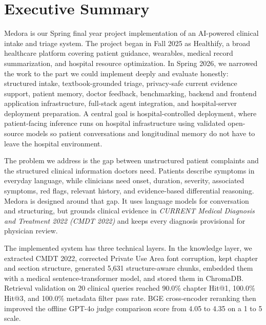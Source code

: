 
\chapter*{Executive Summary}

Medora is our Spring final year project implementation of an AI-powered clinical intake and triage system. The project began in Fall 2025 as Healthify, a broad healthcare platform covering patient guidance, wearables, medical record summarization, and hospital resource optimization. In Spring 2026, we narrowed the work to the part we could implement deeply and evaluate honestly: structured intake, textbook-grounded triage, privacy-safe current evidence support, patient memory, doctor feedback, benchmarking, backend and frontend application infrastructure, full-stack agent integration, and hospital-server deployment preparation. A central goal is hospital-controlled deployment, where patient-facing inference runs on hospital infrastructure using validated open-source models so patient conversations and longitudinal memory do not have to leave the hospital environment.

The problem we address is the gap between unstructured patient complaints and the structured clinical information doctors need. Patients describe symptoms in everyday language, while clinicians need onset, duration, severity, associated symptoms, red flags, relevant history, and evidence-based differential reasoning. Medora is designed around that gap. It uses language models for conversation and structuring, but grounds clinical evidence in \textit{CURRENT Medical Diagnosis and Treatment 2022 (CMDT 2022)} and keeps every diagnosis provisional for physician review.

The implemented system has three technical layers. In the knowledge layer, we extracted CMDT 2022, corrected Private Use Area font corruption, kept chapter and section structure, generated 5,631 structure-aware chunks, embedded them with a medical sentence-transformer model, and stored them in ChromaDB. Retrieval validation on 20 clinical queries reached 90.0\% chapter Hit@1, 100.0\% Hit@3, and 100.0\% metadata filter pass rate. BGE cross-encoder reranking then improved the offline GPT-4o judge comparison score from 4.05 to 4.35 on a 1 to 5 scale.

